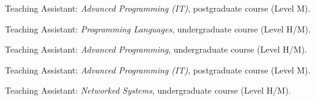 \begin{cvitemize}[2017--2018]
	\item Teaching Assistant: \emph{Advanced Programming (IT)}, postgraduate course (Level M).
\end{cvitemize}
\begin{cvitemize}[2016--2017]
	\item Teaching Assistant: \emph{Programming Languages}, undergraduate course (Level H/M).
	\item Teaching Assistant: \emph{Advanced Programming}, undergraduate course (Level H/M).
	\item Teaching Assistant: \emph{Advanced Programming (IT)}, postgraduate course (Level M).
	\item Teaching Assistant: \emph{Networked Systems}, undergraduate course (Level H/M).
\end{cvitemize}